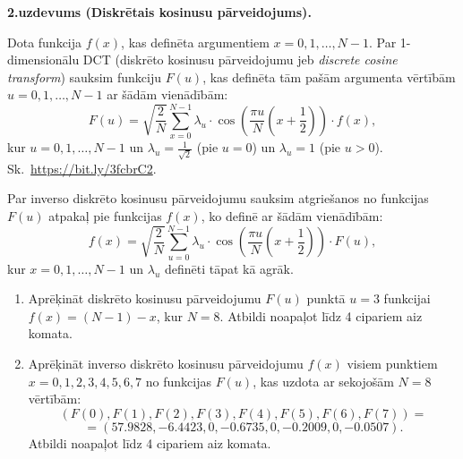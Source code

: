 \documentclass[a4paper,12pt]{article}
\begin{document}
\vspace{10pt}
{\bf 2.uzdevums (Diskrētais kosinusu pārveidojums).}

Dota funkcija $f(x)$, kas definēta argumentiem $x=0,1,\ldots,N-1$. 
Par 1-dimensionālu DCT (diskrēto kosinusu pārveidojumu jeb {\em discrete cosine transform}) sauksim 
funkciju $F(u)$, kas definēta tām pašām argumenta vērtībām $u=0,1,\ldots,N-1$ 
ar šādām vienādībām: 
$$F(u) = \sqrt{\frac{2}{N}} \sum\limits_{x=0}^{N-1} \lambda_u \cdot \cos \left( \frac{\pi u}{N}\left(  x+\frac{1}{2} \right) \right) \cdot f(x),$$
kur $u=0,1,\ldots,N-1$ un $\lambda_u = \frac{1}{\sqrt{2}}$ (pie $u=0$) un $\lambda_u = 1$ (pie $u>0$).\\
Sk.\ \url{https://bit.ly/3fcbrC2}.

Par inverso diskrēto kosinusu pārveidojumu sauksim atgriešanos no funkcijas $F(u)$ atpakaļ pie funkcijas $f(x)$, 
ko definē ar šādām vienādībām:
$$f(x) = \sqrt{\frac{2}{N}} \sum\limits_{u=0}^{N-1} \lambda_u \cdot \cos \left( \frac{\pi u}{N}\left(  x+\frac{1}{2} \right) \right) \cdot F(u),$$
kur $x=0,1,\ldots,N-1$ un $\lambda_u$ definēti tāpat kā agrāk.
\begin{enumerate}[label=(\alph*)]
\item 
Aprēķināt diskrēto kosinusu pārveidojumu $F(u)$ punktā $u=3$
funkcijai\\ $f(x) = (N-1)-x$, kur $N=8$. 
Atbildi noapaļot līdz 4 cipariem aiz komata.
\item 
Aprēķināt inverso diskrēto kosinusu pārveidojumu $f(x)$ visiem 
punktiem $x=0,1,2,3,4,5,6,7$ no funkcijas $F(u)$, kas uzdota ar
sekojošām $N=8$ vērtībām:
$$(F(0),F(1),F(2),F(3),F(4),F(5),F(6),F(7)) =$$
$$ = (57.9828,-6.4423,0,-0.6735,0,-0.2009,0,-0.0507).$$
Atbildi noapaļot līdz 4 cipariem aiz komata.
\end{enumerate}
\end{document}
